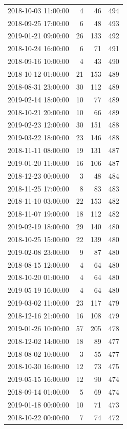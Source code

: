 \begin{tabular}{lrrr}
2018-10-03 11:00:00 & 4 & 46 & 494 \\
2018-09-25 17:00:00 & 6 & 48 & 493 \\
2019-01-21 09:00:00 & 26 & 133 & 492 \\
2018-10-24 16:00:00 & 6 & 71 & 491 \\
2018-09-16 10:00:00 & 4 & 43 & 490 \\
2018-10-12 01:00:00 & 21 & 153 & 489 \\
2018-08-31 23:00:00 & 30 & 112 & 489 \\
2019-02-14 18:00:00 & 10 & 77 & 489 \\
2018-10-21 20:00:00 & 10 & 66 & 489 \\
2019-02-23 12:00:00 & 30 & 151 & 488 \\
2019-03-22 18:00:00 & 23 & 146 & 488 \\
2018-11-11 08:00:00 & 19 & 131 & 487 \\
2019-01-20 11:00:00 & 16 & 106 & 487 \\
2018-12-23 00:00:00 & 3 & 48 & 484 \\
2018-11-25 17:00:00 & 8 & 83 & 483 \\
2018-11-10 03:00:00 & 22 & 153 & 482 \\
2018-11-07 19:00:00 & 18 & 112 & 482 \\
2019-02-19 18:00:00 & 29 & 140 & 480 \\
2018-10-25 15:00:00 & 22 & 139 & 480 \\
2019-02-08 23:00:00 & 9 & 87 & 480 \\
2018-08-15 12:00:00 & 4 & 64 & 480 \\
2018-10-20 01:00:00 & 4 & 64 & 480 \\
2019-05-19 16:00:00 & 4 & 64 & 480 \\
2019-03-02 11:00:00 & 23 & 117 & 479 \\
2018-12-16 21:00:00 & 16 & 108 & 479 \\
2019-01-26 10:00:00 & 57 & 205 & 478 \\
2018-12-02 14:00:00 & 18 & 89 & 477 \\
2018-08-02 10:00:00 & 3 & 55 & 477 \\
2018-10-30 16:00:00 & 12 & 73 & 475 \\
2019-05-15 16:00:00 & 12 & 90 & 474 \\
2018-09-14 01:00:00 & 5 & 69 & 474 \\
2019-01-18 00:00:00 & 10 & 71 & 473 \\
2018-10-22 00:00:00 & 7 & 74 & 472 \\

\end{tabular}
